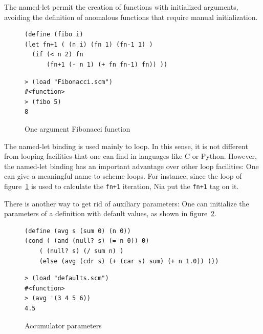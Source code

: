 \documentclass[a4paper,12pt]{book}
\newenvironment{fmpage}[1]
           {\begin{lrbox}{\fmbox}\begin{minipage}{#1}}
           {\end{minipage}\end{lrbox}\fbox{\usebox{\fmbox}}}
\begin{document}
The named-let
permit the creation of functions
with initialized arguments, avoiding
the definition of anomalous functions
that require manual initialization.

\begin{figure}[!h]
\begin{fmpage}{0.9\linewidth}
\begin{verbatim}
(define (fibo i)
(let fn+1 ( (n i) (fn 1) (fn-1 1) )
  (if (< n 2) fn
      (fn+1 (- n 1) (+ fn fn-1) fn)) ))

\end{verbatim}
\end{fmpage}

\begin{fmpage}{0.9\linewidth}
\begin{verbatim}
> (load "Fibonacci.scm")
#<function>
> (fibo 5)
8
\end{verbatim}
\end{fmpage}
\caption{One argument Fibonacci function}
\label{oneargfib}
\end{figure}

The named-let binding is used mainly
to loop. In this sense, it is not
different from looping facilities
that one can find in languages like C
or Python. However, the named-let
binding has an important advantage
over other loop facilities: One can
give a meaningful 
name
to scheme loops.
For instance, since the loop of
figure~\ref{oneargfib} is used 
to calculate the \verb|fn+1| iteration,
Nia put the \verb|fn+1| tag on it.

There is another way to get rid of
auxiliary 
parameters:
One can initialize the parameters
of a definition with
default values,
as shown
in figure~\ref{accumulators}.


\begin{figure}[!h]
\begin{fmpage}{\linewidth}
\begin{verbatim}
(define (avg s (sum 0) (n 0))
(cond ( (and (null? s) (= n 0)) 0)
    ( (null? s) (/ sum n) )
    (else (avg (cdr s) (+ (car s) sum) (+ n 1.0)) )))
\end{verbatim}
\end{fmpage}

\begin{fmpage}{\linewidth}
\begin{verbatim}
> (load "defaults.scm")
#<function>
> (avg '(3 4 5 6))
4.5
\end{verbatim}
\end{fmpage}
\caption{Accumulator parameters}
\label{accumulators}
\end{figure}
\end{document}
